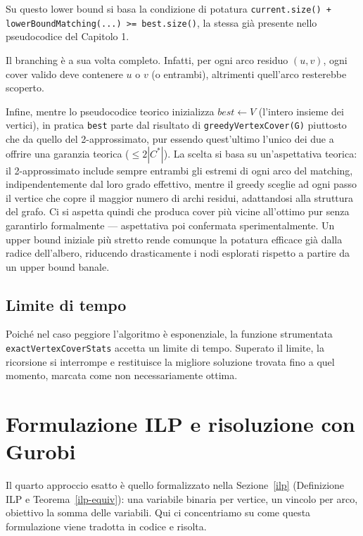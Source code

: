 \begin{sloppypar}
Su questo lower bound si basa la condizione di potatura \texttt{current.size() + lowerBoundMatching(...) >= best.size()}, la stessa già presente nello pseudocodice del Capitolo 1.
\end{sloppypar}

Il branching è a sua volta completo. Infatti, per ogni arco residuo $(u,v)$, ogni cover valido deve contenere $u$ o $v$ (o entrambi), altrimenti quell'arco resterebbe scoperto. 

Infine, mentre lo pseudocodice teorico inizializza $\textit{best} \gets V$ (l'intero insieme dei vertici), in pratica \texttt{best} parte dal risultato di \texttt{greedyVertexCover(G)} piuttosto che da quello del 2-approssimato, pur essendo quest'ultimo l'unico dei due a offrire una garanzia teorica ($\le 2|C^*|$). La scelta si basa su un'aspettativa teorica: il 2-approssimato include sempre entrambi gli estremi di ogni arco del matching, indipendentemente dal loro grado effettivo, mentre il greedy sceglie ad ogni passo il vertice che copre il maggior numero di archi residui, adattandosi alla struttura del grafo. Ci si aspetta quindi che produca cover più vicine all'ottimo pur senza garantirlo formalmente — aspettativa poi confermata sperimentalmente. Un upper bound iniziale più stretto rende comunque la potatura efficace già dalla radice dell'albero, riducendo drasticamente i nodi esplorati rispetto a partire da un upper bound banale.

\subsection{Limite di tempo} 
Poiché nel caso peggiore l'algoritmo è esponenziale, la funzione strumentata \texttt{exact\-Vertex\-Cover\-Stats} 
accetta un limite di tempo. Superato il limite, la ricorsione si interrompe e restituisce la migliore soluzione trovata fino a quel momento, marcata come non necessariamente ottima. 


\section{Formulazione ILP e risoluzione con Gurobi} \label{ilp-impl}

Il quarto approccio esatto è quello formalizzato nella Sezione~\ref{ilp} (Definizione ILP e Teorema~\ref{ilp-equiv}): una variabile binaria per vertice, un vincolo per arco, obiettivo la somma delle variabili. Qui ci concentriamo su come questa formulazione viene tradotta in codice e risolta.

